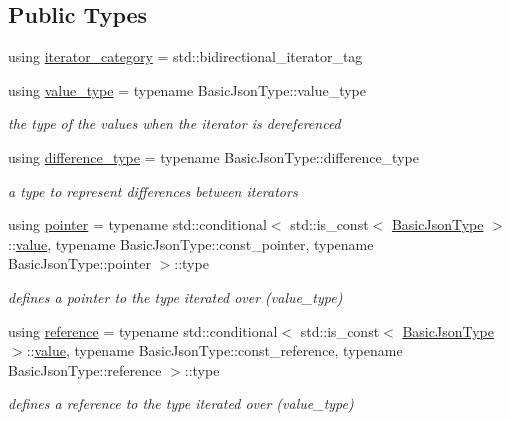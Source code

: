 \subsection*{Public Types}
\begin{DoxyCompactItemize}
\item 
using \hyperlink{classnlohmann_1_1detail_1_1iter__impl_ad9e091f5c70b34b5b1abc1ab15fd9106}{iterator\+\_\+category} = std\+::bidirectional\+\_\+iterator\+\_\+tag
\item 
using \hyperlink{classnlohmann_1_1detail_1_1iter__impl_ab35586a44f2222272c5346baa3013f67}{value\+\_\+type} = typename Basic\+Json\+Type\+::value\+\_\+type
\begin{DoxyCompactList}\small\item\em the type of the values when the iterator is dereferenced \end{DoxyCompactList}\item 
using \hyperlink{classnlohmann_1_1detail_1_1iter__impl_a2f7ea9f7022850809c60fc3263775840}{difference\+\_\+type} = typename Basic\+Json\+Type\+::difference\+\_\+type
\begin{DoxyCompactList}\small\item\em a type to represent differences between iterators \end{DoxyCompactList}\item 
using \hyperlink{classnlohmann_1_1detail_1_1iter__impl_a69e52f890ce8c556fd68ce109e24b360}{pointer} = typename std\+::conditional$<$ std\+::is\+\_\+const$<$ \hyperlink{classnlohmann_1_1detail_1_1iter__impl_abf18f18793f84b0222aebb5a2a87da7a}{Basic\+Json\+Type} $>$\+::\hyperlink{classnlohmann_1_1detail_1_1iter__impl_adc4048d25e057ce8ec0b912642c24731}{value}, typename Basic\+Json\+Type\+::const\+\_\+pointer, typename Basic\+Json\+Type\+::pointer $>$\+::type
\begin{DoxyCompactList}\small\item\em defines a pointer to the type iterated over (value\+\_\+type) \end{DoxyCompactList}\item 
using \hyperlink{classnlohmann_1_1detail_1_1iter__impl_a5be8001be099c6b82310f4d387b953ce}{reference} = typename std\+::conditional$<$ std\+::is\+\_\+const$<$ \hyperlink{classnlohmann_1_1detail_1_1iter__impl_abf18f18793f84b0222aebb5a2a87da7a}{Basic\+Json\+Type} $>$\+::\hyperlink{classnlohmann_1_1detail_1_1iter__impl_adc4048d25e057ce8ec0b912642c24731}{value}, typename Basic\+Json\+Type\+::const\+\_\+reference, typename Basic\+Json\+Type\+::reference $>$\+::type
\begin{DoxyCompactList}\small\item\em defines a reference to the type iterated over (value\+\_\+type) \end{DoxyCompactList}\end{DoxyCompactItemize}
